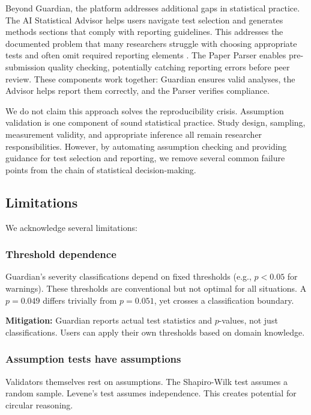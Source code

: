 \documentclass[article]{jss}
\begin{document}
Beyond Guardian, the platform addresses additional gaps in statistical practice. The AI Statistical Advisor helps users navigate test selection and generates methods sections that comply with reporting guidelines. This addresses the documented problem that many researchers struggle with choosing appropriate tests and often omit required reporting elements \citep{appelbaum2018jars}. The Paper Parser enables pre-submission quality checking, potentially catching reporting errors before peer review. These components work together: Guardian ensures valid analyses, the Advisor helps report them correctly, and the Parser verifies compliance.

We do not claim this approach solves the reproducibility crisis. Assumption validation is one component of sound statistical practice. Study design, sampling, measurement validity, and appropriate inference all remain researcher responsibilities. However, by automating assumption checking and providing guidance for test selection and reporting, we remove several common failure points from the chain of statistical decision-making.

\subsection{Limitations}

We acknowledge several limitations:

\subsubsection{Threshold dependence}

Guardian's severity classifications depend on fixed thresholds (e.g., $p < 0.05$ for warnings). These thresholds are conventional but not optimal for all situations. A $p = 0.049$ differs trivially from $p = 0.051$, yet crosses a classification boundary.

\textbf{Mitigation:} Guardian reports actual test statistics and $p$-values, not just classifications. Users can apply their own thresholds based on domain knowledge.

\subsubsection{Assumption tests have assumptions}

Validators themselves rest on assumptions. The Shapiro-Wilk test assumes a random sample. Levene's test assumes independence. This creates potential for circular reasoning.
\end{document}
